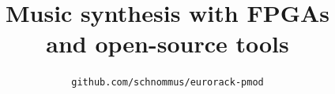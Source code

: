 \documentclass[aspectratio=169]{beamer}
\title{Music synthesis with FPGAs \\and open-source tools}
\subtitle{}
\author{\texttt{github.com/schnommus/eurorack-pmod}}
\institute{me@sebholzapfel.com}
\date{}
\begin{document}
\maketitle

\setwatermark{}









\end{document}
